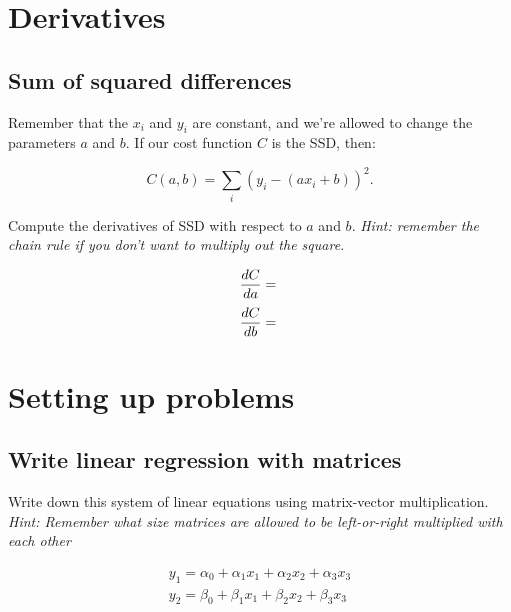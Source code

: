 \documentclass[11pt]{article}
\begin{document}
\section{ Derivatives }

\subsection{ Sum of squared differences }

Remember that the $x_i$ and $y_i$ are constant, and we're allowed to
change the parameters $a$ and $b$. If our cost function $C$ is the SSD,
then:

\begin{equation}
    C(a,b) = \sum_i (y_i - (ax_i + b))^2.
\end{equation}

Compute the derivatives of SSD with respect to $a$ and $b$.
\emph{ Hint: remember the chain rule if you don't want to multiply out
the square.}


\begin{equation}
        \frac{ dC }{ da } =  \\
\end{equation}
\begin{equation}
        \frac{ dC }{ db } =  \\
\end{equation}


\section{Setting up problems}

\subsection{Write linear regression with matrices}

Write down this system of linear equations using matrix-vector
multiplication.  \emph{ Hint: Remember what size matrices are allowed
to be left-or-right multiplied with each other}

\begin{equation}
    \begin{array}{l}
    y_1 = \alpha_0 + \alpha_1 x_1  + \alpha_2 x_2 + \alpha_3 x_3 \\
    y_2 = \beta_0 + \beta_1 x_1  + \beta_2 x_2 + \beta_3 x_3 \\
    \end{array}
\end{equation}
\end{document}
